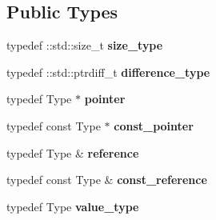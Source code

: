 \subsection*{Public Types}
\begin{DoxyCompactItemize}
\item 
\hypertarget{classLoki_1_1LokiAllocator_a1c87886cf95b47057a9ddf03591c65a8}{}typedef \+::std\+::size\+\_\+t {\bfseries size\+\_\+type}\label{classLoki_1_1LokiAllocator_a1c87886cf95b47057a9ddf03591c65a8}

\item 
\hypertarget{classLoki_1_1LokiAllocator_a8160d93d1777e704ec2a210a3bf275a5}{}typedef \+::std\+::ptrdiff\+\_\+t {\bfseries difference\+\_\+type}\label{classLoki_1_1LokiAllocator_a8160d93d1777e704ec2a210a3bf275a5}

\item 
\hypertarget{classLoki_1_1LokiAllocator_aae09ea567738ddcefabf38d568bde0b5}{}typedef Type $\ast$ {\bfseries pointer}\label{classLoki_1_1LokiAllocator_aae09ea567738ddcefabf38d568bde0b5}

\item 
\hypertarget{classLoki_1_1LokiAllocator_a246c6466f4ffbabfbacb7eb9bcbc3225}{}typedef const Type $\ast$ {\bfseries const\+\_\+pointer}\label{classLoki_1_1LokiAllocator_a246c6466f4ffbabfbacb7eb9bcbc3225}

\item 
\hypertarget{classLoki_1_1LokiAllocator_a3c0e84862b9fdf9eb20e5b950d7ec13a}{}typedef Type \& {\bfseries reference}\label{classLoki_1_1LokiAllocator_a3c0e84862b9fdf9eb20e5b950d7ec13a}

\item 
\hypertarget{classLoki_1_1LokiAllocator_abf623fcffd35ec6ddc95b87112a586ab}{}typedef const Type \& {\bfseries const\+\_\+reference}\label{classLoki_1_1LokiAllocator_abf623fcffd35ec6ddc95b87112a586ab}

\item 
\hypertarget{classLoki_1_1LokiAllocator_ad811fbe72e96b093d78fd47b0f655caf}{}typedef Type {\bfseries value\+\_\+type}\label{classLoki_1_1LokiAllocator_ad811fbe72e96b093d78fd47b0f655caf}

\end{DoxyCompactItemize}
